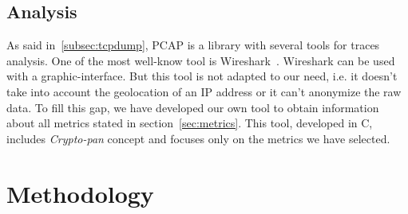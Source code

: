 \documentclass[10pt, conference, a4paper, twocolumns]{IEEEtran}
\def\yassine#1{\textbf{\textcolor{blue}{yassine : #1}}}
\begin{document}
\subsection{Analysis}
As said in~\ref{subsec:tcpdump}, PCAP is a library with several tools for traces analysis. One of the most well-know tool is Wireshark~\cite{chappell2010wireshark}. Wireshark can be used with a graphic-interface. But this tool is not adapted to our need, i.e. it doesn't take into account the geolocation of an IP address or it can't anonymize the raw data. %
To fill this gap, %
 we have developed our own tool to obtain information about all metrics stated in section~\ref{sec:metrics}. This tool, developed in C, includes \emph{Crypto-pan} concept and focuses only on the metrics we have selected.



\section{Methodology}
\label{sec:methodo}

\end{document}
